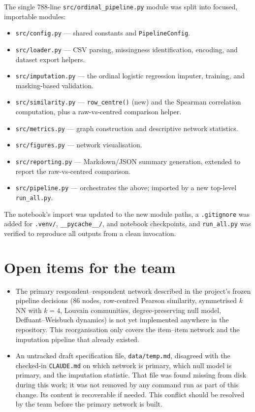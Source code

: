 \documentclass[11pt]{article}
\begin{document}
The single 788-line \texttt{src/ordinal\_pipeline.py} module was split into
focused, importable modules:

\begin{itemize}
  \item \texttt{src/config.py} --- shared constants and \texttt{PipelineConfig}.
  \item \texttt{src/loader.py} --- CSV parsing, missingness identification,
        encoding, and dataset export helpers.
  \item \texttt{src/imputation.py} --- the ordinal logistic regression
        imputer, training, and masking-based validation.
  \item \texttt{src/similarity.py} --- \texttt{row\_centre()} (new) and the
        Spearman correlation computation, plus a raw-vs-centred comparison
        helper.
  \item \texttt{src/metrics.py} --- graph construction and descriptive
        network statistics.
  \item \texttt{src/figures.py} --- network visualisation.
  \item \texttt{src/reporting.py} --- Markdown/JSON summary generation,
        extended to report the raw-vs-centred comparison.
  \item \texttt{src/pipeline.py} --- orchestrates the above; imported by a
        new top-level \texttt{run\_all.py}.
\end{itemize}

The notebook's import was updated to the new module paths, a
\texttt{.gitignore} was added for \texttt{.venv/}, \texttt{\_\_pycache\_\_/},
and notebook checkpoints, and \texttt{run\_all.py} was verified to reproduce
all outputs from a clean invocation.

\section{Open items for the team}

\begin{itemize}
  \item The primary respondent--respondent network described in the
        project's frozen pipeline decisions (86 nodes, row-centred Pearson
        similarity, symmetrised $k$NN with $k=4$, Louvain communities,
        degree-preserving null model, Deffuant--Weisbuch dynamics) is not yet
        implemented anywhere in the repository. This reorganisation only
        covers the item--item network and the imputation pipeline that
        already existed.
  \item An untracked draft specification file, \texttt{data/temp.md},
        disagreed with the checked-in \texttt{CLAUDE.md} on which network is
        primary, which null model is primary, and the imputation statistic.
        That file was found missing from disk during this work; it was not
        removed by any command run as part of this change. Its content is
        recoverable if needed. This conflict should be resolved by the team
        before the primary network is built.
\end{itemize}
\end{document}
